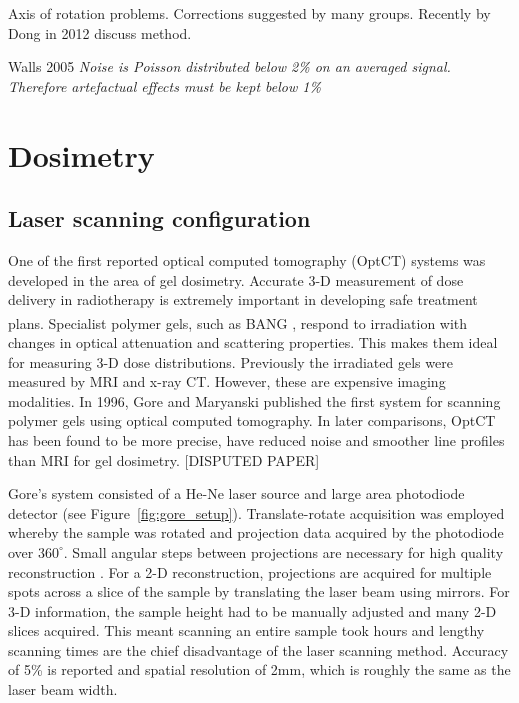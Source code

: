 \documentclass[12pt]{article}
\begin{document}
Axis of rotation problems. Corrections suggested by many groups. Recently by Dong in 2012 \cite{Dong:2012}  discuss method.

Walls 2005 \textit{Noise is Poisson distributed below 2\% on an averaged signal. Therefore artefactual effects must be kept below 1\%}


\newpage
\section{Dosimetry}
\label{sec:dos}
\subsection{Laser scanning configuration}


One of the first reported optical computed tomography (OptCT) systems was developed in the area of gel dosimetry. Accurate 3-D measurement of dose delivery in radiotherapy is extremely important in developing safe treatment plans. Specialist polymer gels, such as BANG\textsuperscript{\textregistered} \cite{Maryanski:1996}, respond to irradiation with changes in optical attenuation and scattering properties.  This makes them ideal for measuring 3-D dose distributions. Previously the irradiated gels were measured by MRI and x-ray CT. However, these are expensive imaging modalities. In 1996, Gore and Maryanski published the first system for scanning polymer gels using optical computed tomography. \cite{Gore:1999tg} In later comparisons, OptCT has been found to be more precise, have reduced noise and smoother line profiles than MRI for gel dosimetry. \cite{Oldham:2001gs} [DISPUTED PAPER]

Gore's system consisted of a  He-Ne laser source and large area photodiode detector (see Figure~\ref{fig:gore_setup}). Translate-rotate acquisition was employed whereby the sample was rotated and projection data  acquired  by the photodiode over $360^{\circ}$. Small angular steps between projections are necessary for high quality reconstruction \cite{russ2002image}. For a 2-D reconstruction, projections are acquired for multiple spots across a slice of the sample by translating the laser beam using mirrors. For 3-D information, the sample height  had to be manually adjusted and many 2-D slices acquired. This meant scanning an entire sample took  hours and lengthy scanning times are the chief disadvantage of the laser scanning method.  Accuracy of 5\% is reported and spatial resolution of 2mm, which is roughly the same as the laser beam width. \cite{Gore:1999tg}
\end{document}
